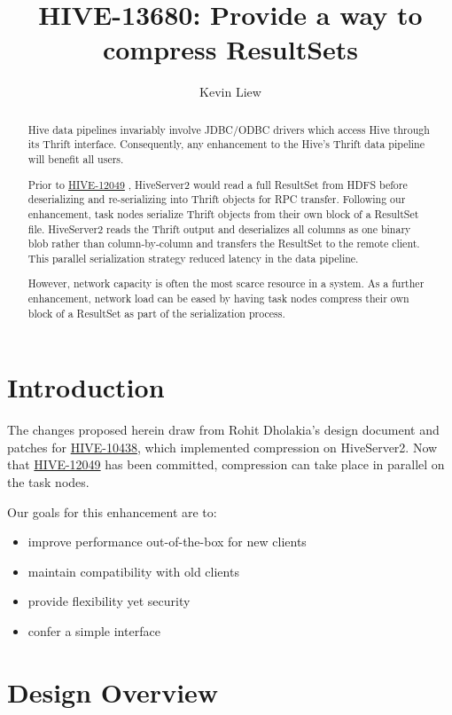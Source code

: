 \documentclass[11pt,a4paper]{article}
\title{HIVE-13680: Provide a way to compress ResultSets}
\author{Kevin Liew}
\begin{document}
\maketitle

\begin{abstract}
	Hive data pipelines invariably involve JDBC/ODBC drivers which access Hive through its Thrift interface. 
	Consequently, any enhancement to the Hive's Thrift data pipeline will benefit all users.
	
	Prior to 
	\href{https://issues.apache.org/jira/browse/HIVE-12049}{HIVE-12049}
	, HiveServer2 would read a full ResultSet from HDFS before deserializing and re-serializing into Thrift objects for RPC transfer.
	Following our enhancement, task nodes serialize Thrift objects from their own block of a ResultSet file. 
	HiveServer2 reads the Thrift output and deserializes all columns as one binary blob rather than column-by-column and transfers the ResultSet to the remote client. 
	This parallel serialization strategy reduced latency in the data pipeline.
	
	However, network capacity is often the most scarce resource in a system. 
	As a further enhancement, network load can be eased by having task nodes compress their own block of a ResultSet as part of the serialization process.
\end{abstract}

\section{Introduction}
	The changes proposed herein draw from Rohit Dholakia's design document and patches for
	\href{https://issues.apache.org/jira/browse/HIVE-10438}{HIVE-10438}, which implemented compression on HiveServer2.
	Now that
	\href{https://issues.apache.org/jira/browse/HIVE-12049}{HIVE-12049}
	has been committed, compression can take place in parallel on the task nodes.
	
	Our goals for this enhancement are to:
	\begin{itemize}
		\item improve performance out-of-the-box for new clients
		\item maintain compatibility with old clients
		\item provide flexibility yet security
		\item confer a simple interface
	\end{itemize}
	
\section{Design Overview}
\end{document}
